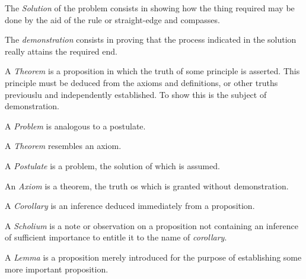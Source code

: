         The \textit{Solution} of the problem consists in showing how the 
        thing required may be done by the aid of the rule or straight-edge 
        and compasses. 

        The \textit{demonstration} consists in proving that the process 
        indicated in the solution really attains the required end. 

        A \textit{Theorem} is a proposition in which the truth of some 
        principle is asserted. This principle must be deduced from the 
        axioms and definitions, or other truths previouslu and 
        independently established. To show this is the subject of 
        demonstration. 

        A \textit{Problem} is analogous to a postulate. 

        A \textit{Theorem} resembles an axiom. 

        A \textit{Postulate} is a problem, the solution of which is 
        assumed. 

        An \textit{Axiom} is a theorem, the truth os which is granted 
        without demonstration. 

        A \textit{Corollary} is an inference deduced immediately from a 
        proposition. 

        A \textit{Scholium} is a note or observation on a proposition not 
        containing an inference of sufficient importance to entitle it to 
        the name of \textit{corollary}. 

        A \textit{Lemma} is a proposition merely introduced for the 
        purpose of establishing some more important proposition. 


